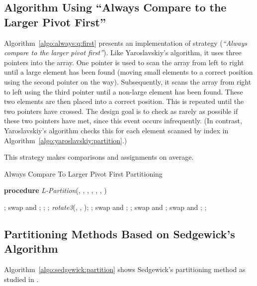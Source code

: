 \documentclass[prodmode,acmtalg]{acmsmall}
\begin{document}
\subsection{Algorithm Using ``Always Compare to the Larger Pivot First''}
\label{app:sec:algo:larger:first}
Algorithm~\ref{algo:always:q:first} presents an implementation of strategy  (\emph{``Always compare
to the larger pivot first''}). Like Yaroslavskiy's algorithm, it uses three pointers into the array.
One pointer is used to scan the array from left to right until a large element has been
found (moving small elements to a correct position using the second pointer on the way). Subsequently,
it scans the array from right to left using the third pointer until 
a non-large element has been found. These two elements
are then placed into a correct position. This is repeated until the two pointers have crossed. The design goal
is to check as rarely as possible if these two pointers have met, since this event occurs infrequently. (In contrast,
Yaroslavskiy's algorithm checks this for each element scanned by index  in Algorithm~\ref{algo:yaroslavskiy:partition}.)

This strategy makes  comparisons and  assignments on average.

\begin{algorithm}
    \caption{Always Compare To Larger Pivot First Partitioning}\samepage\label{algo:always:q:first}
    \textbf{procedure} \textit{L-Partition}(,
		, , ,
		, , )
    \begin{algorithmic}[1]
        \State 
        \While{}
            \While{}
                \State ;
            \EndWhile
            \While{}
                \If{}
                    \State swap  and ;
                    \State ;
                \EndIf
                \State ;
            \EndWhile
            \If{}
                \If{}
                \State \textit{rotate3}(, , 
                );
                    \State ;
                \Else
                    \State swap  and ;
                \EndIf
                \State ;
            \EndIf
        \State 
        \EndWhile
        \State swap  and ;
        \State swap  and ;
        \State ;
    \end{algorithmic}
\end{algorithm}
\subsection{Partitioning Methods Based on Sedgewick's Algorithm}\label{app:sec:sedgewick}
Algorithm~\ref{algo:sedgewick:partition} shows Sedgewick's partitioning method
as studied in \cite{sedgewick}.
\end{document}
